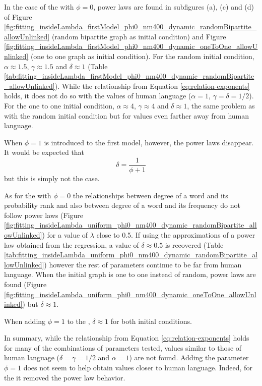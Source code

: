 In the case of the \firstmodel{} with $\phi=0$, power laws are found in subfigures (a), (c) and (d) of Figure \ref{fig:fitting_insideLambda_firstModel_phi0_nm400_dynamic_randomBipartite_allowUnlinked} (random bipartite graph as initial condition) and Figure \ref{fig:fitting_insideLambda_firstModel_phi0_nm400_dynamic_oneToOne_allowUnlinked} (one to one graph as initial condition).
For the random initial condition, $\alpha \approx 1.5$, $\gamma \approx 1.5$ and $\delta \approx 1$ (Table \ref{tab:fitting_insideLambda_firstModel_phi0_nm400_dynamic_randomBipartite_allowUnlinked}). While the relationship from Equation \eqref{eq:relation-exponents} holds, it does not do so with the values of human language ($\alpha=1$, $\gamma=\delta=1/2$).
For the one to one initial condition, $\alpha \approx 4$, $\gamma \approx 4$ and $\delta \approx 1$, the same problem as with the random initial condition but for values even farther away from human language.

When $\phi=1$ is introduced to the first model, however, the power laws disappear.
It would be expected that \cite{Ferrer2018a}
\begin{equation*}
  \delta = \frac{1}{\phi + 1}
\end{equation*}
but this is simply not the case.

As for the \secondmodel{} with $\phi=0$ the relationships between degree of a word and its probability rank and also between degree of a word and its frequency do not follow power laws (Figure \ref{fig:fitting_insideLambda_uniform_phi0_nm400_dynamic_randomBipartite_allowUnlinked}) for a value of $\lambda$ close to 0.5.
If using the approximations of a power law obtained from the regression, a value of $\delta \approx 0.5$ is recovered (Table \ref{tab:fitting_insideLambda_uniform_phi0_nm400_dynamic_randomBipartite_allowUnlinked}) however the rest of parameters continue to be far from human language.
When the initial graph is one to one instead of random, power laws are found (Figure \ref{fig:fitting_insideLambda_uniform_phi0_nm400_dynamic_oneToOne_allowUnlinked}) but $\delta \approx 1$.

When adding $\phi=1$ to the \secondmodel{}, $\delta \approx 1$ for both initial conditions.

In summary, while the relationship from Equation \eqref{eq:relation-exponents} holds for many of the combinations of parameters tested, values similar to those of human language ($\delta=\gamma=1/2$ and $\alpha=1$) are not found.
Adding the parameter $\phi=1$ does not seem to help obtain values closer to human language.
Indeed, for the \firstmodel{} it removed the power law behavior.

